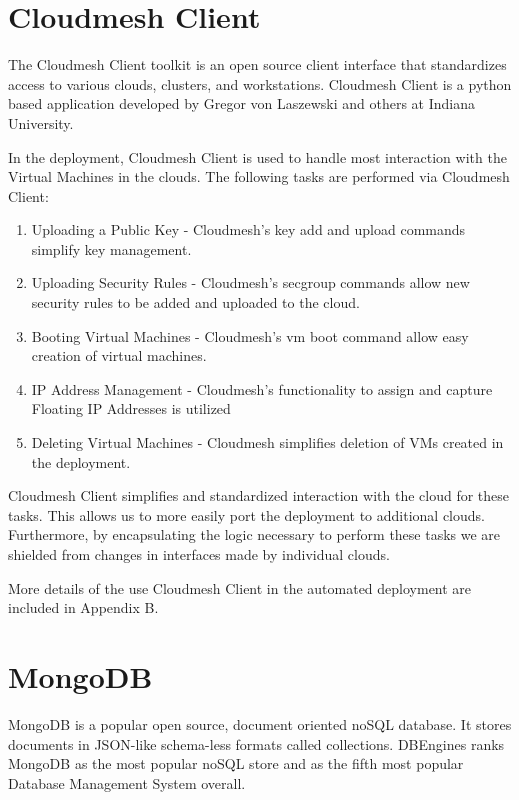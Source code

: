 \documentclass[9pt,twocolumn,twoside]{../../styles/osajnl}
\begin{document}
\section{Cloudmesh Client}

The Cloudmesh Client toolkit is an open source client interface that standardizes access to various clouds, clusters, and workstations. \cite{www-cloudmesh}  Cloudmesh Client is a python based application developed by Gregor von Laszewski and others at Indiana University.

In the deployment, Cloudmesh Client is used to handle most interaction with the Virtual Machines in the clouds.  The following tasks are performed via Cloudmesh Client:

\vspace{-\topsep}
\begin{enumerate}
\item Uploading a Public Key - Cloudmesh's key add and upload commands simplify key management.
\item Uploading Security Rules - Cloudmesh's secgroup commands allow new security rules to be added and uploaded to the cloud.
\item Booting Virtual Machines - Cloudmesh's vm boot command allow easy creation of virtual machines.
\item IP Address Management - Cloudmesh's functionality to assign and capture Floating IP Addresses is utilized
\item Deleting Virtual Machines - Cloudmesh simplifies deletion of VMs created in the deployment.
\end{enumerate}
\vspace{-\topsep}

Cloudmesh Client simplifies and standardized interaction with the cloud for these tasks.  This allows us to more easily port the deployment to additional clouds.  Furthermore, by encapsulating the logic necessary to perform these tasks we are shielded from changes in interfaces made by individual clouds.

More details of the use Cloudmesh Client in the automated deployment are included in Appendix B.

\section{MongoDB}

MongoDB is a popular open source, document oriented noSQL database.  It stores documents in JSON-like schema-less formats called collections. \cite{www-MonWiki}  DBEngines ranks MongoDB as the most popular noSQL store and as the fifth most popular Database Management System overall. \cite{www-dbEngines}
\end{document}
